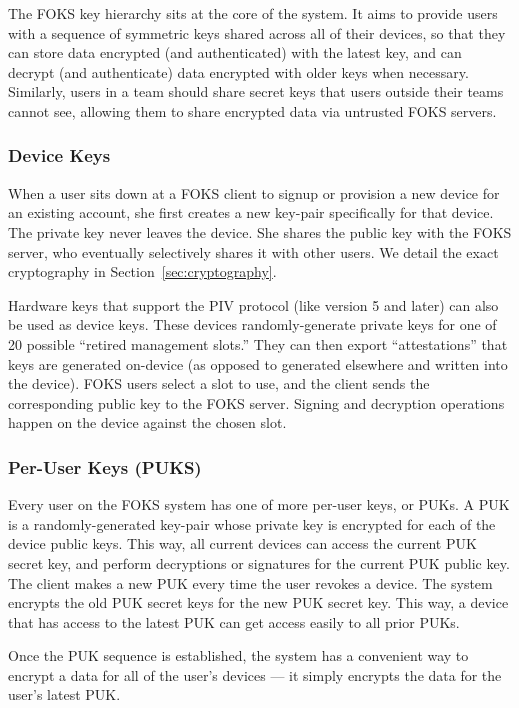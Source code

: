 The FOKS key hierarchy sits at the core of the system. It aims to provide users
with a sequence of symmetric keys shared across all of their devices, so that
they can store data encrypted (and authenticated) with the latest key, and can decrypt (and
authenticate) data encrypted with older keys when necessary. Similarly, users in
a team should share secret keys that users outside their teams cannot see, allowing
them to share encrypted data via untrusted FOKS servers.

\subsubsection{Device Keys}

When a user sits down at a FOKS client to signup or provision a new device
for an existing account, she first creates a new key-pair specifically
for that device. The private key never leaves the device. She shares the public key
with the FOKS server, who eventually selectively shares it with other users.
We detail the exact cryptography in Section~\ref{sec:cryptography}.

Hardware keys that support the PIV protocol (like \yubi{} version 5 and later)
can also be used as device keys. These devices randomly-generate private keys
for one of 20 possible ``retired management slots.'' They can then
export ``attestations'' that keys are generated on-device (as opposed to generated
elsewhere and written into the device). FOKS users select a slot to use, and the
client sends the corresponding public key to the FOKS server. Signing and
decryption operations happen on the device against the chosen slot. 

\subsubsection{Per-User Keys (PUKS)}

Every user on the FOKS system has one of more per-user keys, or PUKs. A PUK
is a randomly-generated key-pair whose private key is encrypted for each of
the device public keys. This way, all current devices can access the current
PUK secret key, and perform decryptions or signatures for the current PUK public
key. The client makes a new PUK every time the user revokes a device. The system
encrypts the old PUK secret keys for the new PUK secret key. This way,
a device that has access to the latest PUK can get access easily to all prior
PUKs.

Once the PUK sequence is established, the system has a convenient way to encrypt
a data for all of the user's devices --- it simply encrypts the data for the 
user's latest PUK.

